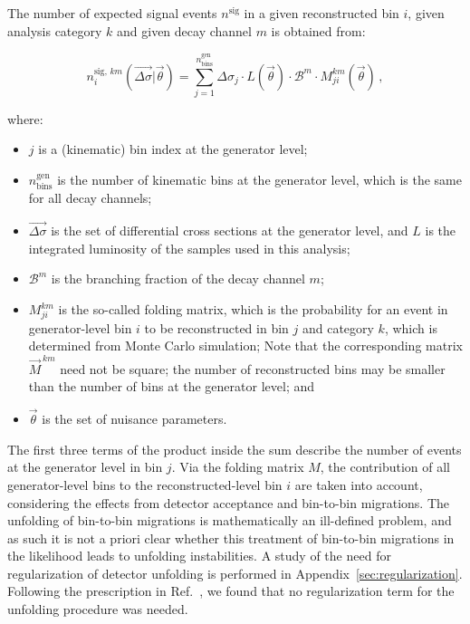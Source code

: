 The number of expected signal events $n^\text{sig}$ in a given reconstructed bin $i$, given analysis category $k$ and given decay channel $m$ is obtained from:
% 
\begin{linenomath*}
\begin{equation}
n_i^{\text{sig},\,km}(\vec{\Delta\sigma} | \vec{\theta})
= \sum_{j=1}^{n_\text{bins}^\text{gen}}
    \Delta\sigma_j \cdot L(\vec{\theta})
     \cdot \mathcal{B}^{m}
     \cdot M_{ji}^{km}(\vec{\theta})
\,,
\label{eq:nsig}
\end{equation}
\end{linenomath*}
% 
where:
% 
\begin{itemize}
\item $j$ is a (kinematic) bin index at the generator level;
% 
\item $n_\text{bins}^\text{gen}$ is the number of kinematic bins at the generator level, which is the same for all decay channels;
% 
\item $\vec{\Delta\sigma}$ is the set of differential cross sections at the generator level, and $L$ is the integrated luminosity of the samples used in this analysis;
% 
\item $\mathcal{B}^m$ is the branching fraction of the decay channel $m$;
% 
\item $M_{ji}^{km}$ is the so-called folding matrix, which is the probability for an event in generator-level bin $i$ to be reconstructed in bin $j$ and category $k$, which is determined from Monte Carlo simulation;
% 
Note that the corresponding matrix $\vec{M}^{\,km}$ need not be square; the number of reconstructed bins may be smaller than the number of bins at the generator level; and
% 
\item $\vec{\theta}$ is the set of nuisance parameters.
\end{itemize}
% 
The first three terms of the product inside the sum describe the number of events at the generator level in bin $j$.
% 
Via the folding matrix $M$, the contribution of all generator-level bins to the reconstructed-level bin $i$ are taken into account, considering the effects from detector acceptance and bin-to-bin migrations.
% 
The unfolding of bin-to-bin migrations is mathematically an ill-defined problem, and as such it is not a priori clear whether this treatment of bin-to-bin migrations in the likelihood leads to unfolding instabilities.
% 
A study of the need for regularization of detector unfolding is performed in Appendix~\ref{sec:regularization}.
% 
Following the prescription in Ref.~\cite{Hansen:LShape}, we found that no regularization term for the unfolding procedure was needed.


